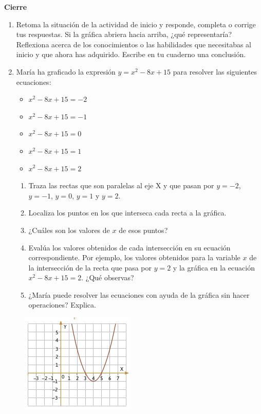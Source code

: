 \documentclass[11pt]{book}
\begin{document}
\begin{boxK}
  \begin{center}\textbf{Cierre}\end{center}

  \begin{enumerate}
    \item Retoma la situación de la actividad de inicio y responde, completa o corrige
          tus respuestas. Si la gráfica abriera hacia arriba, ¿qué representaría?
          Reflexiona acerca de los conocimientos o las habilidades que necesitabas al
          inicio y que ahora has adquirido. Escribe en tu cuaderno una conclusión.
    \item María ha graficado la expresión $y = x^2-8x + 15$ para resolver las siguientes
          ecuaciones:
          \begin{itemize}
            \item $x^2-8x + 15 = -2$
            \item $x^2-8x + 15 = -1$
            \item $x^2-8x + 15 = 0$
            \item $x^2-8x + 15 = 1$
            \item $x^2-8x + 15 = 2$
          \end{itemize}
          \begin{enumerate}
            \item Traza las rectas que son paralelas al eje X y que pasan por $y = -2$, $y = -1$, $y = 0$, $y = 1$ y $y = 2$.
            \item Localiza los puntos en los que interseca cada recta a la gráfica.
            \item ¿Cuáles son los valores de $x$ de esos puntos?
            \item Evalúa los valores obtenidos de cada intersección en su ecuación correspondiente. Por ejemplo, los valores obtenidos para la variable $x$ de la intersección de la recta que pasa por $y = 2$ y la gráfica en la ecuación $x^2 - 8x + 15 = 2$. ¿Qué observas?
            \item ¿María puede resolver las ecuaciones con ayuda de la gráfica sin hacer operaciones? Explica.
          \end{enumerate}
  \end{enumerate}

  \begin{figure}[H]
    \centering
    \includegraphics[width=0.4\linewidth]{s7l2_cierre.png}
    \label{fig:s7l2_cierre}
  \end{figure}
\end{boxK}
\end{document}
